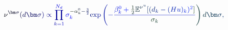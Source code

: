 \documentclass[12pt]{article}
\begin{document}
\makeatletter
\renewcommand*{\@textcolor}[3]{%
  \protect\leavevmode
  \begingroup
    \color#1{#2}#3%
  \endgroup
}
\makeatother
\begin{displaymath}
\mathcolor[RGB]{0,0,15}{\nu} ^ { \mathcolor[RGB]{0,0,30}{\bm} { \mathcolor[RGB]{0,0,45}{\sigma} } } \mathcolor[RGB]{0,0,60}{(} \mathcolor[RGB]{0,0,75}{d} \mathcolor[RGB]{0,0,90}{\bm} { \mathcolor[RGB]{0,0,105}{\sigma} } \mathcolor[RGB]{0,0,120}{)} \mathcolor[RGB]{0,0,135}{\propto} \mathcolor[RGB]{0,0,150}{\prod} _ { \mathcolor[RGB]{0,0,165}{k} \mathcolor[RGB]{0,0,180}{=} \mathcolor[RGB]{0,0,195}{1} } ^ { \mathcolor[RGB]{0,0,210}{N} _ { \mathcolor[RGB]{0,0,225}{d} } } \mathcolor[RGB]{0,0,240}{\sigma} _ { \mathcolor[RGB]{0,0,255}{k} } ^ { \mathcolor[RGB]{0,15,0}{-} \mathcolor[RGB]{0,15,15}{\alpha} _ { \mathcolor[RGB]{0,15,30}{k} } ^ { \mathcolor[RGB]{0,15,45}{0} } \mathcolor[RGB]{0,15,60}{-} \mathcolor[RGB]{0,15,75}{\frac { \mathcolor[RGB]{0,15,90}{3} } { \mathcolor[RGB]{0,15,105}{2} } } } \mathrm { \mathcolor[RGB]{0,15,120}{e} \mathcolor[RGB]{0,15,135}{x} \mathcolor[RGB]{0,15,150}{p} } \mathcolor[RGB]{0,15,165}{\left(} \mathcolor[RGB]{0,15,180}{-} \mathcolor[RGB]{0,15,195}{\frac { \mathcolor[RGB]{0,15,210}{\beta} _ { \mathcolor[RGB]{0,15,225}{k} } ^ { \mathcolor[RGB]{0,15,240}{0} } \mathcolor[RGB]{0,15,255}{+} \mathcolor[RGB]{0,30,0}{\frac { \mathcolor[RGB]{0,30,15}{1} } { \mathcolor[RGB]{0,30,30}{2} } } \mathbb { \mathcolor[RGB]{0,30,45}{E} } ^ { \mathcolor[RGB]{0,30,60}{\nu} ^ { \mathcolor[RGB]{0,30,75}{u} } } \mathcolor[RGB]{0,30,90}{[} \mathcolor[RGB]{0,30,105}{(} \mathcolor[RGB]{0,30,120}{d} _ { \mathcolor[RGB]{0,30,135}{k} } \mathcolor[RGB]{0,30,150}{-} \mathcolor[RGB]{0,30,165}{(} \mathcolor[RGB]{0,30,180}{H} \mathcolor[RGB]{0,30,195}{u} \mathcolor[RGB]{0,30,210}{)} _ { \mathcolor[RGB]{0,30,225}{k} } \mathcolor[RGB]{0,30,240}{)} ^ { \mathcolor[RGB]{0,30,255}{2} } \mathcolor[RGB]{0,45,0}{]} } { \mathcolor[RGB]{0,45,15}{\sigma} _ { \mathcolor[RGB]{0,45,30}{k} } } } \mathcolor[RGB]{0,45,45}{\right)} \mathcolor[RGB]{0,45,60}{d} \mathcolor[RGB]{0,45,75}{\bm} { \mathcolor[RGB]{0,45,90}{\sigma} } \mathcolor[RGB]{0,45,105}{,}
\end{displaymath}
\end{document}
